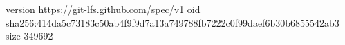 version https://git-lfs.github.com/spec/v1
oid sha256:414da5c73183c50ab4f9f9d7a13a749788fb7222c0f99daef6b30b6855542ab3
size 349692
